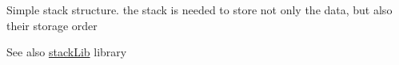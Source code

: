 Simple stack structure. the stack is needed to store not only the data, but also their storage order

\begin{DoxySeeAlso}{See also}
{\ttfamily \mbox{\hyperlink{group__stack_lib}{stack\+Lib}}} library 
\end{DoxySeeAlso}
